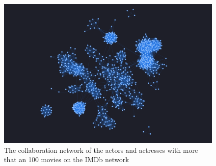 \begin{center}
    \s \nd {}
\end{center}

\begin{figure}[H] \label{imdb-a-network}
    \centering
    \includegraphics[width=13cm]{Screenshot.png}
    \caption{The collaboration network of the actors and actresses with more that an 100 movies on the IMDb network}
\end{figure}
